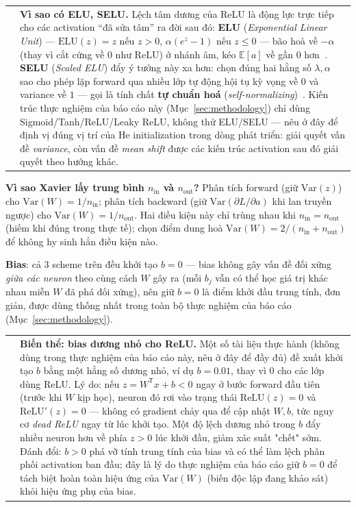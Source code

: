 \documentclass[12pt,a4paper]{report}
\makeatletter
\newenvironment{tructiep}[1][Cách hiểu đơn giản]
  {\par\smallskip\noindent\begin{tabular}{@{}p{0.35em}@{\hspace{6pt}}p{\dimexpr\linewidth-1.9em\relax}@{}}
   \textcolor{boxln}{\rule{2pt}{\baselineskip}} & \textbf{#1.}\enspace\ignorespaces}
  {\end{tabular}\par\smallskip}
\newcommand{\en}[1]{\textit{#1}}
\newcommand{\T}{^{\mathsf{T}}}
\makeatother
\begin{document}
\begin{tructiep}[Vì sao có ELU, SELU]
Lệch tâm dương của ReLU là động lực trực tiếp cho các activation ``đã sửa
tâm'' ra đời sau đó: \textbf{ELU} (\en{Exponential Linear Unit})
--- $\mathrm{ELU}(z)=z$ nếu $z>0$, $\alpha(e^z-1)$ nếu $z\le0$
--- bão hoà về $-\alpha$ (thay vì cắt cứng về $0$ như ReLU) ở nhánh âm,
kéo $\mathbb E[a]$ về gần $0$ hơn~\citep{clevert2016elu}. \textbf{SELU}
(\en{Scaled ELU}) đẩy ý tưởng này xa hơn: chọn đúng hai hằng số
$\lambda,\alpha$ sao cho phép lặp forward qua nhiều lớp tự động hội tụ
kỳ vọng về $0$ và variance về $1$ --- gọi là tính chất
\textbf{tự chuẩn hoá} (\en{self-normalizing})~\citep{klambauer2017selu}.
Kiến trúc thực nghiệm của báo cáo này (Mục~\ref{sec:methodology}) chỉ
dùng Sigmoid/Tanh/ReLU/Leaky ReLU, không thử ELU/SELU --- nêu ở đây để
định vị đúng vị trí của He initialization trong dòng phát triển: giải
quyết vấn đề \emph{variance}, còn vấn đề \emph{mean shift} được các kiến
trúc activation sau đó giải quyết theo hướng khác.
\end{tructiep}

\textbf{Vì sao Xavier lấy trung bình $n_{\text{in}}$ và $n_{\text{out}}$?}
Phân tích forward (giữ $\mathrm{Var}(z)$) cho $\mathrm{Var}(W)=1/n_{\text{in}}$;
phân tích backward (giữ $\mathrm{Var}(\partial L/\partial a)$ khi lan
truyền ngược) cho $\mathrm{Var}(W)=1/n_{\text{out}}$. Hai điều kiện này chỉ
trùng nhau khi $n_{\text{in}}=n_{\text{out}}$ (hiếm khi đúng trong thực
tế); \citet{glorot2010understanding} chọn điểm dung hoà
$\mathrm{Var}(W)=2/(n_{\text{in}}+n_{\text{out}})$ để không hy sinh hẳn
điều kiện nào.

\textbf{Bias}: cả 3 scheme trên đều khởi tạo $b=0$ --- bias không gây vấn
đề đối xứng \emph{giữa các neuron} theo cùng cách $W$ gây ra (mỗi $b_j$
vẫn có thể học giá trị khác nhau miễn $W$ đã phá đối xứng), nên giữ $b=0$
là điểm khởi đầu trung tính, đơn giản, được dùng thống nhất trong toàn bộ
thực nghiệm của báo cáo (Mục~\ref{sec:methodology}).

\begin{tructiep}[Biến thể: bias dương nhỏ cho ReLU]
Một số tài liệu thực hành (không dùng trong thực nghiệm của báo cáo này,
nêu ở đây để đầy đủ) đề xuất khởi tạo $b$ bằng một hằng số dương nhỏ, ví
dụ $b=0.01$, thay vì $0$ cho các lớp dùng ReLU. Lý do: nếu $z=W\T x+b<0$
ngay ở bước forward đầu tiên (trước khi $W$ kịp học), neuron đó rơi vào
trạng thái $\mathrm{ReLU}(z)=0$ và $\mathrm{ReLU}'(z)=0$ --- không có
gradient chảy qua để cập nhật $W,b$, tức nguy cơ \emph{dead ReLU} ngay từ
lúc khởi tạo. Một độ lệch dương nhỏ trong $b$ đẩy nhiều neuron hơn về phía
$z>0$ lúc khởi đầu, giảm xác suất "chết" sớm. Đánh đổi: $b>0$ phá vỡ tính
trung tính của bias và có thể làm lệch phân phối activation ban đầu; đây
là lý do thực nghiệm của báo cáo giữ $b=0$ để tách biệt hoàn toàn hiệu ứng
của $\mathrm{Var}(W)$ (biến độc lập đang khảo sát) khỏi hiệu ứng phụ của
bias.
\end{tructiep}
\end{document}
